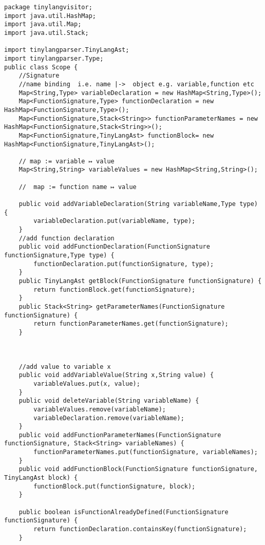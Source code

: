 \begin{lstlisting}[basicstyle=\miniscule,caption=Scope,label=listing:scope]
package tinylangvisitor;
import java.util.HashMap;
import java.util.Map;
import java.util.Stack;

import tinylangparser.TinyLangAst;
import tinylangparser.Type;
public class Scope {
	//Signature
	//name binding  i.e. name |->  object e.g. variable,function etc
	Map<String,Type> variableDeclaration = new HashMap<String,Type>();
	Map<FunctionSignature,Type> functionDeclaration = new HashMap<FunctionSignature,Type>();
	Map<FunctionSignature,Stack<String>> functionParameterNames = new HashMap<FunctionSignature,Stack<String>>();
	Map<FunctionSignature,TinyLangAst> functionBlock= new HashMap<FunctionSignature,TinyLangAst>();

	// map := variable ↦ value
	Map<String,String> variableValues = new HashMap<String,String>();

	//  map := function name ↦ value

	public void addVariableDeclaration(String variableName,Type type) {
		variableDeclaration.put(variableName, type);
	}
	//add function declaration
	public void addFunctionDeclaration(FunctionSignature functionSignature,Type type) {
		functionDeclaration.put(functionSignature, type);
	}
	public TinyLangAst getBlock(FunctionSignature functionSignature) {
		return functionBlock.get(functionSignature);
	}
	public Stack<String> getParameterNames(FunctionSignature functionSignature) {
		return functionParameterNames.get(functionSignature);
	}
	
	
	
	//add value to variable x
	public void addVariableValue(String x,String value) {
		variableValues.put(x, value);
	}
	public void deleteVariable(String variableName) {
		variableValues.remove(variableName);
		variableDeclaration.remove(variableName);	
	}
	public void addFunctionParameterNames(FunctionSignature functionSignature, Stack<String> variableNames) {
		functionParameterNames.put(functionSignature, variableNames);
	}
	public void addFunctionBlock(FunctionSignature functionSignature, TinyLangAst block) {
		functionBlock.put(functionSignature, block);
	}
	
	public boolean isFunctionAlreadyDefined(FunctionSignature functionSignature) {
		return functionDeclaration.containsKey(functionSignature);
	}
	


\end{lstlisting}
